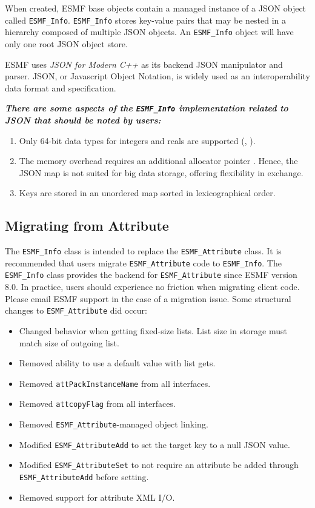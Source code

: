 
When created, ESMF base objects contain a managed instance of a JSON object \cite{json_for_modern_cpp_object} called \texttt{ESMF\_Info}. \texttt{ESMF\_Info} stores key-value pairs that may be nested in a hierarchy composed of multiple JSON objects. An \texttt{ESMF\_Info} object will have only one root JSON object store.

ESMF uses \textit{JSON for Modern C++} \cite{json_for_modern_cpp} as its backend JSON manipulator and parser. JSON, or Javascript Object Notation, is widely used as an interoperability data format and specification.

\textbf{\textit{There are some aspects of the \texttt{ESMF\_Info} implementation related to JSON that should be noted by users:}}
\begin{enumerate}
    \item Only 64-bit data types for integers and reals are supported (\cite{json_for_modern_cpp_64bit_int}, \cite{json_for_modern_cpp_64bit_float}).
    \item The memory overhead requires an additional allocator pointer \cite{json_for_modern_cpp_memory_overhead}. Hence, the JSON map is not suited for big data storage, offering flexibility in exchange.
    \item Keys are stored in an unordered map sorted in lexicographical order.
\end{enumerate}

\subsection{Migrating from Attribute}
The \texttt{ESMF\_Info} class is intended to replace the \texttt{ESMF\_Attribute} class. It is recommended that users migrate \texttt{ESMF\_Attribute} code to \texttt{ESMF\_Info}. The \texttt{ESMF\_Info} class provides the backend for \texttt{ESMF\_Attribute} since ESMF version 8.0. In practice, users should experience no friction when migrating client code. Please email ESMF support in the case of a migration issue. Some structural changes to \texttt{ESMF\_Attribute} did occur:
\begin{itemize}
    \item Changed behavior when getting fixed-size lists. List size in storage must match size of outgoing list.
    \item Removed ability to use a default value with list gets.
    \item Removed \texttt{attPackInstanceName} from all interfaces.
    \item Removed \texttt{attcopyFlag} from all interfaces.
    \item Removed \texttt{ESMF\_Attribute}-managed object linking.
    \item Modified \texttt{ESMF\_AttributeAdd} to set the target key to a null JSON value.
    \item Modified \texttt{ESMF\_AttributeSet} to not require an attribute be added through \texttt{ESMF\_AttributeAdd} before setting.
    \item Removed support for attribute XML I/O.
\end{itemize}

